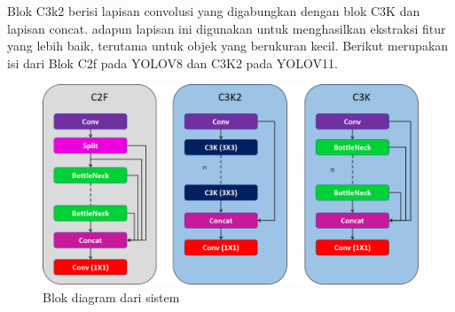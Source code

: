 Blok C3k2 berisi lapisan convolusi yang digabungkan dengan blok C3K dan lapisan concat. adapun lapisan ini digunakan untuk menghasilkan ekstraksi fitur yang lebih baik, terutama untuk objek yang berukuran kecil. Berikut merupakan isi dari Blok C2f pada YOLOV8 dan C3K2 pada YOLOV11.

\begin{figure} [H] \centering
  \includegraphics[scale=0.18]{gambar/c2f c3k2.png}
  \caption{Blok diagram dari sistem}
  \label{fig:rancangan penelitian}
\end{figure}





